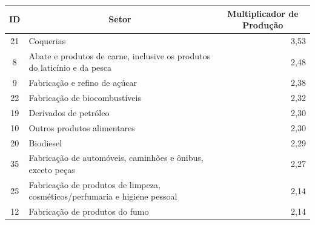 \begin{tabular}{c p{8.5cm} r}
\toprule
\multicolumn{1}{c}{ID} & \multicolumn{1}{c}{Setor} & \multicolumn{1}{c}{Multiplicador de Produção} \\
\midrule
21 & Coquerias & 3,53 \\
8 & Abate e produtos de carne, inclusive os produtos do laticínio e da pesca & 2,48 \\
9 & Fabricação e refino de açúcar & 2,38 \\
22 & Fabricação de biocombustíveis & 2,32 \\
19 & Derivados de petróleo & 2,30 \\
10 & Outros produtos alimentares & 2,30 \\
20 & Biodiesel & 2,29 \\
35 & Fabricação de automóveis, caminhões e ônibus, exceto peças & 2,27 \\
25 & Fabricação de produtos de limpeza, cosméticos/perfumaria e higiene pessoal & 2,14 \\
12 & Fabricação de produtos do fumo & 2,14 \\
\bottomrule
\end{tabular}
